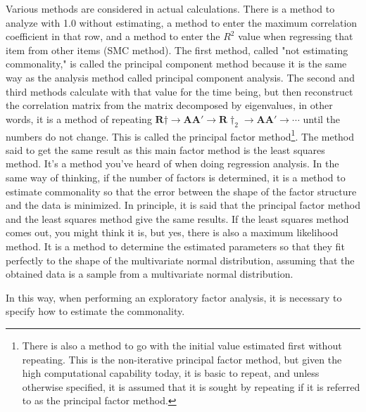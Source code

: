 \documentclass{ltjsbook}
\begin{document}
Various methods are considered in actual calculations. There is a method to analyze with 1.0 without estimating, a method to enter the maximum correlation coefficient in that row, and a method to enter the $R^2$ value when regressing that item from other items (SMC method). The first method, called "not estimating commonality," is called the principal component method because it is the same way as the analysis method called principal component analysis. The second and third methods calculate with that value for the time being, but then reconstruct the correlation matrix from the matrix decomposed by eigenvalues, in other words, it is a method of repeating $\bm{R}\dagger \to \bm{AA'} \to \bm{R}\dagger_2 \to \bm{AA'} \to \cdots $ until the numbers do not change. This is called the principal factor method\footnote{There is also a method to go with the initial value estimated first without repeating. This is the non-iterative principal factor method, but given the high computational capability today, it is basic to repeat, and unless otherwise specified, it is assumed that it is sought by repeating if it is referred to as the principal factor method.}. The method said to get the same result as this main factor method is the least squares method. It's a method you've heard of when doing regression analysis. In the same way of thinking, if the number of factors is determined, it is a method to estimate commonality so that the error between the shape of the factor structure and the data is minimized. In principle, it is said that the principal factor method and the least squares method give the same results. If the least squares method comes out, you might think it is, but yes, there is also a maximum likelihood method. It is a method to determine the estimated parameters so that they fit perfectly to the shape of the multivariate normal distribution, assuming that the obtained data is a sample from a multivariate normal distribution.

In this way, when performing an exploratory factor analysis, it is necessary to specify how to estimate the commonality.

\end{document}
